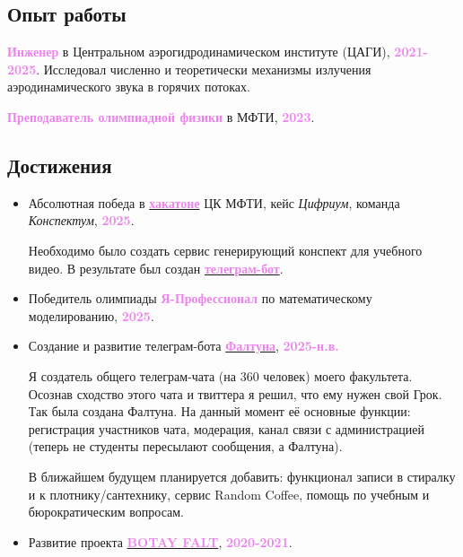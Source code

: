 \documentclass[a4paper,12pt]{article}
\begin{document}
	\subsection*{Опыт работы}
	
	\textcolor{violet}{\textbf{Инженер}} в Центральном аэрогидродинамическом институте (ЦАГИ), \textcolor{violet}{\textbf{2021-2025}}. Исследовал численно и теоретически механизмы излучения аэродинамического звука в горячих потоках.
	
	
	\textcolor{violet}{\textbf{Преподаватель олимпиадной физики}} в МФТИ, \textcolor{violet}{\textbf{2023}}. 
	
	\subsection*{Достижения}
	\begin{itemize}
	\item[\textcolor{violet}{\faTrophy}] Абсолютная победа в \href{https://www.figma.com/board/JqewkyeKxGNv3K8oA2SAdw}{\textcolor{violet}{\textbf{хакатоне}}} ЦК МФТИ, кейс \textit{Цифриум}, команда \textit{Конспектум}, \textcolor{violet}{\textbf{2025}}.
	
	Необходимо было создать сервис генерирующий конспект для учебного видео. В результате был создан \href{https://github.com/alex-petrov-git/konspektum}{\textcolor{violet}{\textbf{телеграм-бот}}}. 
	
	\item[\textcolor{violet}{\faTrophy}] Победитель олимпиады \textcolor{violet}{\textbf{Я-Профессионал}} по математическому моделированию, \textcolor{violet}{\textbf{2025}}.
	
	\item[\textcolor{violet}{\faRocket}] Создание и развитие телеграм-бота \href{https://t.me/faltuna_bot}{\textcolor{violet}{\textbf{Фалтуна}}}, \textcolor{violet}{\textbf{2025-н.в.}}
	
	Я создатель общего телеграм-чата (на 360 человек) моего факультета. Осознав сходство этого чата и твиттера я решил, что ему нужен свой Грок. Так была создана Фалтуна. На данный момент её основные функции: регистрация участников чата, модерация, канал связи с администрацией (теперь не студенты пересылают сообщения, а Фалтуна). 
	
	В ближайшем будущем планируется добавить: функционал записи в стиралку и к плотнику/сантехнику, сервис Random Coffee, помощь по учебным и бюрократическим вопросам.
	
	\item[\textcolor{violet}{\faRocket}] Развитие проекта \href{https://vk.com/botay_falt}{\textcolor{violet}{\textbf{BOTAY FALT}}}, \textcolor{violet}{\textbf{2020-2021}}.
	

\end{itemize}
\end{document}
